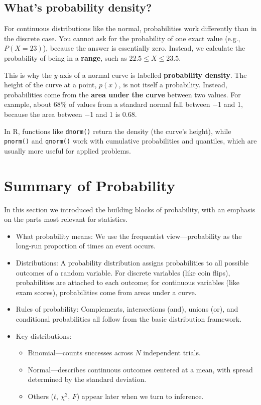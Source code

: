 \documentclass[
  letterpaper,
  DIV=11,
  numbers=noendperiod]{scrreprt}
\providecommand{\tightlist}{%
  \setlength{\itemsep}{0pt}\setlength{\parskip}{0pt}}
\begin{document}
\subsection{What's probability
density?}\label{whats-probability-density}

For continuous distributions like the normal, probabilities work
differently than in the discrete case. You cannot ask for the
probability of one exact value (e.g., \(P(X = 23)\)), because the answer
is essentially zero. Instead, we calculate the probability of being in a
\textbf{range}, such as \(22.5 \leq X \leq 23.5\).

This is why the \(y\)-axis of a normal curve is labelled
\textbf{probability density}. The height of the curve at a point,
\(p(x)\), is not itself a probability. Instead, probabilities come from
the \textbf{area under the curve} between two values. For example, about
68\% of values from a standard normal fall between −1 and 1, because the
area between −1 and 1 is 0.68.

In R, functions like \texttt{dnorm()} return the density (the curve's
height), while \texttt{pnorm()} and \texttt{qnorm()} work with
cumulative probabilities and quantiles, which are usually more useful
for applied problems.

\section{Summary of Probability}\label{summary-of-probability}

In this section we introduced the building blocks of probability, with
an emphasis on the parts most relevant for statistics.

\begin{itemize}
\item
  What probability means: We use the frequentist view---probability as
  the long-run proportion of times an event occurs.
\item
  Distributions: A probability distribution assigns probabilities to all
  possible outcomes of a random variable. For discrete variables (like
  coin flips), probabilities are attached to each outcome; for
  continuous variables (like exam scores), probabilities come from areas
  under a curve.
\item
  Rules of probability: Complements, intersections (and), unions (or),
  and conditional probabilities all follow from the basic distribution
  framework.
\item
  Key distributions:

  \begin{itemize}
  \tightlist
  \item
    Binomial---counts successes across \(N\) independent trials.
  \item
    Normal---describes continuous outcomes centered at a mean, with
    spread determined by the standard deviation.
  \item
    Others (\(t\), \(\chi^2\), \(F\)) appear later when we turn to
    inference.
  \end{itemize}
\end{itemize}
\end{document}
